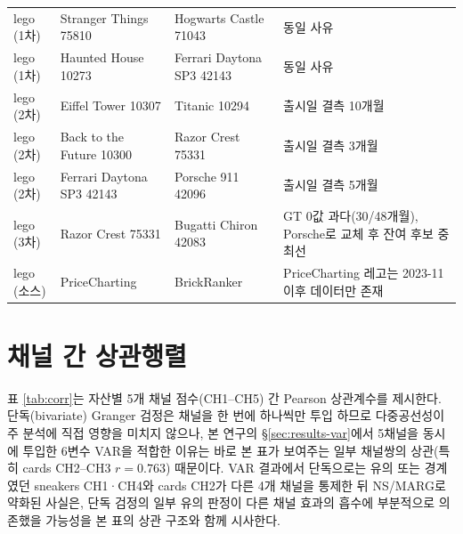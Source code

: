 \documentclass[11pt, a4paper, twocolumn]{article}
\begin{document}
\begin{table}[!tbp]
\begin{tabular}{lp{3.4cm}p{3.2cm}p{5.8cm}}
lego (1차) & Stranger Things 75810 & Hogwarts Castle 71043 & 동일 사유 \\
lego (1차) & Haunted House 10273 & Ferrari Daytona SP3 42143 & 동일 사유 \\
\midrule
lego (2차) & Eiffel Tower 10307 & Titanic 10294 & 출시일 결측 10개월 \\
lego (2차) & Back to the Future 10300 & Razor Crest 75331 & 출시일 결측 3개월 \\
lego (2차) & Ferrari Daytona SP3 42143 & Porsche 911 42096 & 출시일 결측 5개월 \\
\midrule
lego (3차) & Razor Crest 75331 & Bugatti Chiron 42083 & GT 0값 과다(30/48개월), Porsche로 교체 후 잔여 후보 중 최선 \\
\midrule
lego (소스) & PriceCharting & BrickRanker & PriceCharting 레고는 2023-11 이후 데이터만 존재 \\
\bottomrule
\end{tabular}
\end{table}

\section{채널 간 상관행렬}\label{sec:appendix-corr}

표 \ref{tab:corr}는 자산별 5개 채널 점수(CH1--CH5) 간 Pearson 상관계수를
제시한다. 단독(bivariate) Granger 검정은 채널을 한 번에 하나씩만 투입
하므로 다중공선성이 주 분석에 직접 영향을 미치지 않으나, 본 연구의
\S\ref{sec:results-var}에서 5채널을 동시에 투입한 6변수 VAR을 적합한
이유는 바로 본 표가 보여주는 일부 채널쌍의 상관(특히 cards CH2--CH3
$r=0.763$) 때문이다. VAR 결과에서 단독으로는 유의 또는 경계였던
sneakers CH1·CH4와 cards CH2가 다른 4개 채널을 통제한 뒤 NS/MARG로
약화된 사실은, 단독 검정의 일부 유의 판정이 다른 채널 효과의 흡수에
부분적으로 의존했을 가능성을 본 표의 상관 구조와 함께 시사한다.
\end{document}
